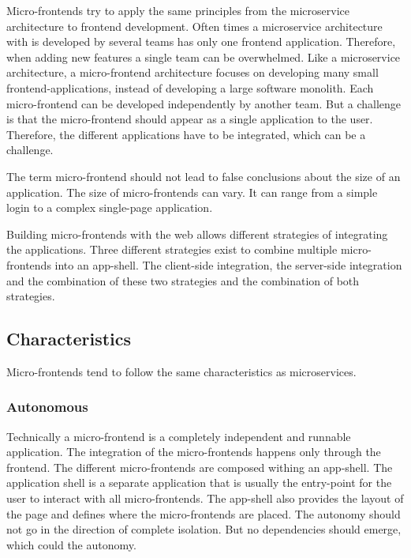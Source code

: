 Micro-frontends try to apply the same principles from the microservice architecture to frontend development. Often times a microservice architecture with is developed by several teams has only one frontend application. Therefore, when adding new features a single team can be overwhelmed. Like a microservice architecture, a micro-frontend architecture focuses on developing many small frontend-applications, instead of developing a large software monolith. Each micro-frontend can be developed independently by another team. But a challenge is that the micro-frontend should appear as a single application to the user. Therefore, the different applications have to be integrated, which can be a challenge.

The term micro-frontend should not lead to false conclusions about the size of an application. The size of micro-frontends can vary. It can range from a simple login to a complex single-page application.

Building micro-frontends with the web allows different strategies of integrating the applications. Three different strategies exist to combine multiple micro-frontends into an app-shell. The client-side integration, the server-side integration and the combination of these two strategies and the combination of both strategies.

\subsection{Characteristics}

Micro-frontends tend to follow the same characteristics as microservices.

\subsubsection{Autonomous}

Technically a micro-frontend is a completely independent and runnable application. The integration of the micro-frontends happens only through the frontend. The different micro-frontends are composed withing an app-shell. The application shell is a separate application that is usually the entry-point for the user to interact with all micro-frontends. The app-shell also provides the layout of the page and defines where the micro-frontends are placed. The autonomy should not go in the direction of complete isolation. But no dependencies should emerge, which could the autonomy. \cite{book:2020:geers:background:micro-frontends:micro-frontends-in-action}

